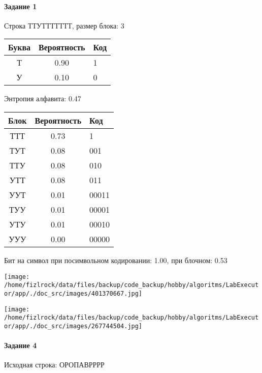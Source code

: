 \documentclass[a4paper, 12pt]{article}
\begin{document}
\paragraph{Задание 1}

Строка ТТУТТТТТТТ, размер блока: 3
\begin{center}
 \begin{tabular}{ |c|c|l| } 
  \hline
     Буква & Вероятность & Код\\ \hline
Т & 0.90 & 1\\\hline
У & 0.10 & 0
\\ \hline \end{tabular}
\end{center}
Энтропия алфавита: 0.47
\begin{center}
 \begin{tabular}{ |c|c|l| } 
  \hline
     Блок & Вероятность & Код\\ \hline
ТТТ & 0.73 & 1\\\hline
ТУТ & 0.08 & 001\\\hline
ТТУ & 0.08 & 010\\\hline
УТТ & 0.08 & 011\\\hline
УУТ & 0.01 & 00011\\\hline
ТУУ & 0.01 & 00001\\\hline
УТУ & 0.01 & 00010\\\hline
УУУ & 0.00 & 00000
\\ \hline \end{tabular}
\end{center}
Бит на символ при посимвольном кодировании: 1.00, при блочном: 0.53

\texttt{[image: /home/fizlrock/data/files/backup/code\_backup/hobby/algoritms/LabExecutor/app/./doc\_src/images/401370667.jpg]}

\texttt{[image: /home/fizlrock/data/files/backup/code\_backup/hobby/algoritms/LabExecutor/app/./doc\_src/images/267744504.jpg]}
\paragraph{Задание 4}


Исходная строка: ОРОПАВРРРР
\end{document}
